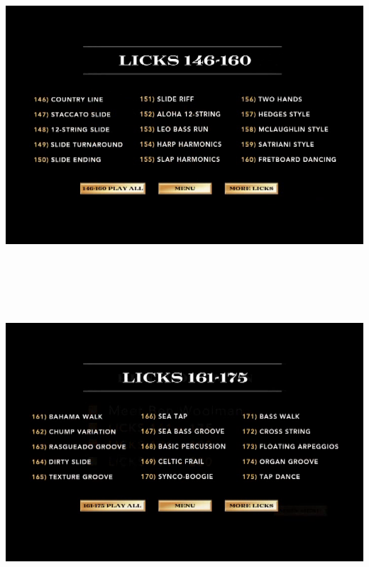 \documentclass[a4paper]{book}
\begin{document}
\begin{center}
\includegraphics[width=17cm,height=11.333cm]{lebluessupportsmethodes-img12.png}
\end{center}



\clearpage

\begin{center}
\includegraphics[width=17cm,height=11.333cm]{lebluessupportsmethodes-img13.png}
\end{center}
\end{document}
